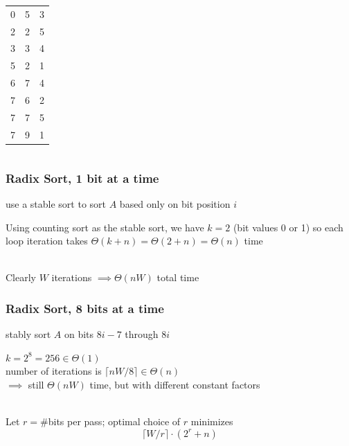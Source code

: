 \documentclass{beamer}
\newcommand{\stanza}{ \\~\ }
\begin{document}
\begin{frame}
\begin{center}
\begin{columns}
\begin{column}{0.25\textwidth}
  \begin{center}
    \begin{tabular}{gcc}
      0&5&3 \\
      2&2&5 \\
      3&3&4 \\
      5&2&1 \\
      6&7&4 \\
      7&6&2 \\
      7&7&5 \\
      7&9&1 \\
    \end{tabular}
  \end{center}
\end{column}
\end{columns}
\end{center}
\end{frame}

\begin{frame} \frametitle{Radix Sort, 1 bit at a time}
  \begin{algorithmic}[1]
      \State use a stable sort to sort $A$ based only on
        bit position $i$
    \EndFor
    \EndFunction
  \end{algorithmic}
  \vspace{.5cm}

Using counting sort as the stable sort, we have $k=2$ (bit values 0 or 1) so each
loop iteration takes $\Theta(k+n)=\Theta(2+n)=\Theta(n)$ time \stanza

Clearly $W$ iterations $\implies \Theta(nW)$ total time
\end{frame}

\begin{frame} \frametitle{Radix Sort, 8 bits at a time}
  \begin{algorithmic}[1]
      \State stably sort $A$ on bits $8i-7$ through $8i$
    \EndFor
    \EndFunction
  \end{algorithmic}
  \vspace{.5cm}

$k=2^8=256 \in \Theta(1)$ \\
number of iterations is $\lceil nW/8 \rceil \in \Theta(n)$ \\
$\implies$ still $\Theta(nW)$ time, but with different constant factors \stanza

Let $r=$\#bits per pass; optimal choice of $r$ minimizes
\[ \lceil W/r \rceil \cdot (2^r + n) \]
\end{frame}
\end{document}
